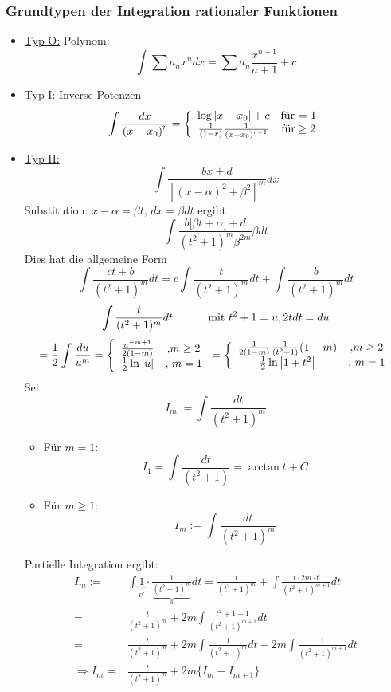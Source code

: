 \subsubsection*{Grundtypen der Integration rationaler Funktionen}
\begin{itemize}
\item \underline{Typ O:} Polynom:\[\int \sum a_{n}x^{n}dx=\sum a_{n}\dfrac {x^{n+1}}{n+1}+c\]
\item \underline{Typ I:} Inverse Potenzen \[\int {\frac{{dx}}{{(x - {x_0})}^r}}  = \left\{ {\begin{array}{*{20}{c}}
{\log \left| {x - {x_0}} \right| + c}&{{\text{für = 1}}}\\
{\frac{1}{{(1 - r)}}\frac{1}{{{{(x - {x_0})}^{r - 1}}}}}&{{\text{für}} \ge {\rm{2}}}
\end{array}} \right.\]

\item \underline{Typ II:}
\[\int { \dfrac {bx+d}{\left[ \left( x-\alpha \right) ^{2}+\beta ^{2}\right] ^{m}}dx}\]
Substitution: $x-\alpha =\beta t$, $dx=\beta dt$ ergibt \[\int {\dfrac {b\lbrack \beta t+\alpha\rbrack +d}{(t^2 +1)^m \beta ^{2m}} \beta dt}\] Dies hat die allgemeine Form \[\int{\frac{ct+b}{(t^2+1)^m}dt}=c\int{\frac{t}{(t^2 +1)^m}dt}+\int{\frac{b}{(t^2 +1)^m} dt}\]
\[\int{\frac{t}{(t^2 +1)^m}dt}\text{\hspace{10mm} mit }t^2+1=u, 2t dt=du\]
$$=\frac{1}{2}\int{\frac{du}{u^m}} = \left\{ {\begin{array}{*{20}{c}}
{\frac{{{u^{ - m + 1}}}}{{2(1 - m)}}}&{{\rm{, }}m \ge 2}\\
{\frac{1}{2}\ln \left| u \right|}&{\text{, }m = 1}
\end{array}} \right. = \left\{ {\begin{array}{*{20}{c}}
{\frac{1}{{2(1 - m)}}\frac{1}{{({t^2} + 1)}}(1 - m)}&{{\rm{, }}m \ge 2}\\
{\frac{1}{2}\ln \left| {1 + {t^2}} \right|}&{\text{, }m = 1}
\end{array}} \right.$$
Sei
\[I_m :=\int{\frac{dt}{(t^2 +1)^m}}\]
\begin{itemize}
\item Für $m=1$: \[I_1=\int{\frac{dt}{(t^2 +1)}}=\arctan t + C\]
\item Für $m\geq1$:\[ I_m:=\int{\frac{dt}{(t^2 +1)^m}}\]
\end{itemize}

Partielle Integration ergibt:
\begin{align*}
{I_m}:=&\int {\underbrace 1_{v'} \cdot \frac{1}{{\underbrace {{{({t^2} + 1)}^m}}_u}}dt}  = \frac{t}{{{{({t^2} + 1)}^m}}} + \int {\frac{{t \cdot 2m \cdot t}}{{{{({t^2} + 1)}^{m + 1}}}}dt} \\
=&\frac{t}{(t^2 +1)^m} + 2m\int{\frac{t^2 +1-1}{(t^2 +1)^{m+1}}dt}\\
=&\frac{t}{(t^2 +1)^m}+2m\int{\frac{1}{(t^2 +1)^m}dt}-2m\int{\frac{1}{(t^2 +1)^{m+1}}dt}\\
\Rightarrow I_m=&\frac{t}{(t^2 +1)^m}+2m\{ I_m - I_{m+1} \}
\end{align*}




\end{itemize}
